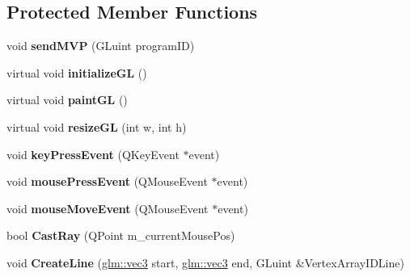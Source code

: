 \subsection*{Protected Member Functions}
\begin{DoxyCompactItemize}
\item 
\hypertarget{classGameView3D_ae077404d42f477162b3540da397a8ad4}{void {\bfseries send\-M\-V\-P} (G\-Luint program\-I\-D)}\label{classGameView3D_ae077404d42f477162b3540da397a8ad4}

\item 
\hypertarget{classGameView3D_a9a9ed01ef943bd24cbf41cb7de1993cc}{virtual void {\bfseries initialize\-G\-L} ()}\label{classGameView3D_a9a9ed01ef943bd24cbf41cb7de1993cc}

\item 
\hypertarget{classGameView3D_aa3422302bf8c9e9b30da86a916aec0aa}{virtual void {\bfseries paint\-G\-L} ()}\label{classGameView3D_aa3422302bf8c9e9b30da86a916aec0aa}

\item 
\hypertarget{classGameView3D_ac8cde08a41504dce4e95f08158bae4e2}{virtual void {\bfseries resize\-G\-L} (int w, int h)}\label{classGameView3D_ac8cde08a41504dce4e95f08158bae4e2}

\item 
\hypertarget{classGameView3D_abeb74e91cd820d7af1e62c714fc1864f}{void {\bfseries key\-Press\-Event} (Q\-Key\-Event $\ast$event)}\label{classGameView3D_abeb74e91cd820d7af1e62c714fc1864f}

\item 
\hypertarget{classGameView3D_a2a66712712d355039299efb5513fbeb2}{void {\bfseries mouse\-Press\-Event} (Q\-Mouse\-Event $\ast$event)}\label{classGameView3D_a2a66712712d355039299efb5513fbeb2}

\item 
\hypertarget{classGameView3D_a16eb2fd0448d2f50b1c5287f86ac9437}{void {\bfseries mouse\-Move\-Event} (Q\-Mouse\-Event $\ast$event)}\label{classGameView3D_a16eb2fd0448d2f50b1c5287f86ac9437}

\item 
\hypertarget{classGameView3D_aa4d6e119510fc03c95d52282579ca8ed}{bool {\bfseries Cast\-Ray} (Q\-Point m\-\_\-current\-Mouse\-Pos)}\label{classGameView3D_aa4d6e119510fc03c95d52282579ca8ed}

\item 
\hypertarget{classGameView3D_a31d588b55fd79e52732a28ccd196733c}{void {\bfseries Create\-Line} (\hyperlink{group__core__types_gad45787527c6ff2bd6680867204eb0354}{glm\-::vec3} start, \hyperlink{group__core__types_gad45787527c6ff2bd6680867204eb0354}{glm\-::vec3} end, G\-Luint \&Vertex\-Array\-I\-D\-Line)}\label{classGameView3D_a31d588b55fd79e52732a28ccd196733c}


\end{DoxyCompactItemize}
